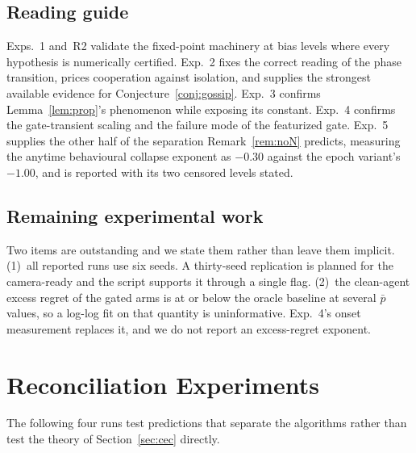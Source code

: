\documentclass[11pt]{article}
\begin{document}
\subsection{Reading guide}
Exps.~1 and~R2 validate the fixed-point machinery at bias levels where
every hypothesis is numerically certified.  Exp.~2 fixes the correct
reading of the phase transition, prices cooperation against isolation,
and supplies the strongest available evidence for
Conjecture~\ref{conj:gossip}.  Exp.~3 confirms
Lemma~\ref{lem:prop}'s phenomenon while exposing its constant.
Exp.~4 confirms the gate-transient scaling and the failure mode of the
featurized gate.  Exp.~5 supplies the other half of the separation
Remark~\ref{rem:noN} predicts, measuring the anytime behavioural
collapse exponent as $-0.30$ against the epoch variant's $-1.00$, and
is reported with its two censored levels stated.

\subsection{Remaining experimental work}
Two items are outstanding and we state them rather than leave them
implicit. (1)~all reported runs use six seeds. A thirty-seed
replication is planned for the camera-ready and the script supports it
through a single flag. (2)~the clean-agent excess regret of the gated
arms is at or below the oracle baseline at several $\bar p$ values, so
a log-log fit on that quantity is uninformative. Exp.~4's onset
measurement replaces it, and we do not report an excess-regret
exponent.

\section{Reconciliation Experiments}\label{sec:recon}

The following four runs test predictions that separate the algorithms
rather than test the theory of Section~\ref{sec:cec} directly.
\end{document}
